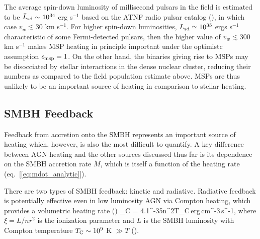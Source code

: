 \documentclass[usenatbib,fleqn]{mn2e}
\begin{document}
The average spin-down luminosity of millisecond pulsars in the field
is estimated to be $\bar{L}_{\rm sd} \sim 10^{34}$ erg s$^{-1}$ based
on the ATNF radio pulsar catalog (\citealt{Manchester+05}), in which
case $v_{w} \lesssim 30$ km s$^{-1}$.  For higher spin-down
luminosities, $L_{\rm sd}\simeq 10^{35}$ ergs s$^{-1}$ characteristic
of some Fermi-detected pulsars, then the higher value of $v_{w}
\lesssim 300$ km s$^{-1}$ makes MSP heating in principle important
under the optimistc assumption $\epsilon_{\rm msp} = 1$.  On the other hand, the
binaries giving rise to MSPs may be disocciated by stellar
interactions in the dense nuclear cluster, reducing their numbers as
compared to the field population estimate above.  MSPs are thus unlikely to be an important source of heating in comparison to stellar heating.


\subsection{SMBH Feedback}

Feedback from accretion onto the SMBH represents an important source of heating which, however, is also the most difficult to quantify.  A key difference between AGN heating and the other sources discussed thus far is its dependence on the SMBH accretion rate $\dot{M}$, which is itself a function of the heating rate (eq.~[\ref{eq:mdot_analytic}]).  

There are two types of SMBH feedback: kinetic and radiative.  Radiative feedback is potentially effective even in low luminosity AGN via Compton heating, which provides a volumetric heating rate (\citealt{Gan+14})
\be
{}_{\rm C} = 4.1^{-35}n^{2}\xi T_{\rm C}\,{\rm erg\,cm^{-3}\,s^{-1}},
\ee
where $\xi = L/n r^{2}$ is the ionization parameter and $L$ is the SMBH luminosity with Compton temperature $T_{\rm C} \sim 10^{9}$ K $\gg T$ (\citealt{Gan+14}).  
\end{document}
